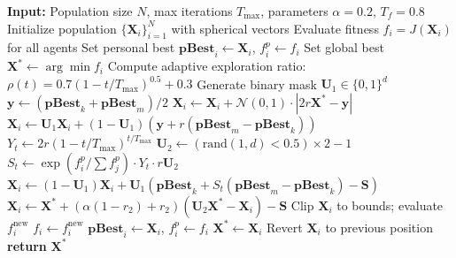 \documentclass[12pt,a4paper]{article}
\begin{document}

\begin{algorithm}[h]
\caption{Adaptive Grey Wolf Optimizer (AGWO)}
\label{alg:agwo}
\begin{algorithmic}[1]
\State \textbf{Input:} Population size $N$, max iterations $T_{\max}$, 
       parameters $\alpha=0.2$, $T_f=0.8$
\State Initialize population $\{\mathbf{X}_i\}_{i=1}^N$ with spherical vectors
\State Evaluate fitness $f_i = J(\mathbf{X}_i)$ for all agents
\State Set personal best $\mathbf{pBest}_i \leftarrow \mathbf{X}_i$, $f_i^{p} \leftarrow f_i$
\State Set global best $\mathbf{X}^* \leftarrow \arg\min f_i$
    \State Compute adaptive exploration ratio: 
           $\rho(t) = 0.7(1 - t/T_{\max})^{0.5} + 0.3$
        \State Generate binary mask $\mathbf{U}_1 \in \{0,1\}^d$
         
             
                \State $\mathbf{y} \leftarrow (\mathbf{pBest}_k + \mathbf{pBest}_m)/2$
                \State $\mathbf{X}_i \leftarrow \mathbf{X}_i + \mathcal{N}(0,1) \cdot |2r\mathbf{X}^* - \mathbf{y}|$
            \Else {}
                \State $\mathbf{X}_i \leftarrow \mathbf{U}_1\mathbf{X}_i + (1-\mathbf{U}_1)(\mathbf{y} + r(\mathbf{pBest}_m - \mathbf{pBest}_k))$
            \EndIf
        \Else {}
            \State $Y_t \leftarrow 2r(1 - t/T_{\max})^{t/T_{\max}}$
            \State $\mathbf{U}_2 \leftarrow (\text{rand}(1,d) < 0.5) \times 2 - 1$
             
                \State $S_t \leftarrow \exp(f_i^p / \sum f_j^p) \cdot Y_t \cdot r\mathbf{U}_2$
                \State $\mathbf{X}_i \leftarrow (1-\mathbf{U}_1)\mathbf{X}_i + \mathbf{U}_1(\mathbf{pBest}_k + S_t(\mathbf{pBest}_m - \mathbf{pBest}_k) - \mathbf{S})$
            \Else {}
                \State $\mathbf{X}_i \leftarrow \mathbf{X}^* + (\alpha(1-r_2)+r_2)(\mathbf{U}_2\mathbf{X}^* - \mathbf{X}_i) - \mathbf{S}$
            \EndIf
        \EndIf
        \State Clip $\mathbf{X}_i$ to bounds; evaluate $f_i^{\text{new}}$
            \State $f_i \leftarrow f_i^{\text{new}}$
             \State $\mathbf{pBest}_i \leftarrow \mathbf{X}_i$, $f_i^p \leftarrow f_i$ \EndIf
             \State $\mathbf{X}^* \leftarrow \mathbf{X}_i$ \EndIf
        \Else
            \State Revert $\mathbf{X}_i$ to previous position
        \EndIf
    \EndFor
\EndFor
\State \textbf{return} $\mathbf{X}^*$
\end{algorithmic}
\end{algorithm}
\end{document}
